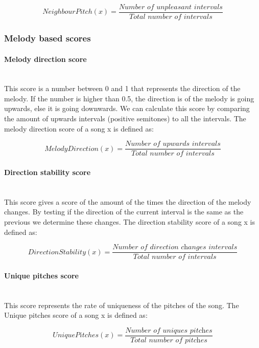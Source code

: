 \documentclass[a4paper]{article}
\begin{document}
\[ NeighbourPitch(x) = \frac{\textit{Number of unpleasant intervals}}{\textit{Total number of intervals} } \]


\subsubsection{Melody based scores}
\paragraph{Melody direction score}\mbox{}\\
This score is a number between 0 and 1 that represents the direction of the melody. If the number is higher than 0.5, the direction is of the melody is going upwards, else it is going downwards. We can calculate this score by comparing the amount of upwards intervals (positive semitones) to all the intervals. The melody direction score of a song x is defined as:

\[ MelodyDirection(x) = \frac{\textit{Number of upwards intervals}}{\textit{Total number of intervals} } \]


\paragraph{Direction stability score}\mbox{}\\
This score gives a score of the amount of the times the direction of the melody changes. By testing if the direction of the current interval is the same as the previous we determine these changes. The direction stability score of a song x is defined as:

\[ DirectionStability(x) = \frac{\textit{Number of direction changes intervals}}{\textit{Total number of intervals} } \]


\paragraph{Unique pitches score}\mbox{}\\
This score represents the rate of uniqueness of the pitches of the song. The Unique pitches score of a song x is defined as:

\[ UniquePitches(x) = \frac{\textit{Number of uniques pitches}}{\textit{Total number of pitches} } \]
\end{document}
